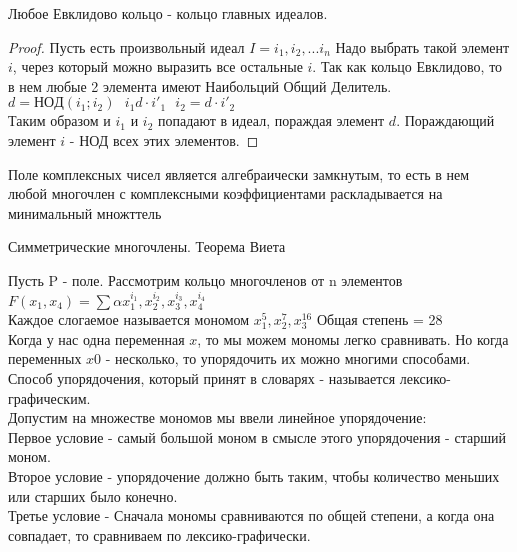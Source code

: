 \begin{theorem}
	Любое Евклидово кольцо - кольцо главных идеалов.
\end{theorem}

\begin{proof}
	Пусть есть произвольный идеал $I = {i_1, i_2, ... i_n}$ Надо выбрать такой
	элемент $i$, через который можно выразить все остальные $i$. Так как кольцо
	Евклидово, то в нем любые 2 элемента имеют Наибольций Общий Делитель.\\
	$d = НОД(i_1; i_2) ~~~ i_1 d \cdot i'_1 ~~~ i_2 = d \cdot i'_2$\\
	Таким образом и $i_1$ и $i_2$ попадают в идеал, пораждая элемент $d$.
	Пораждающий элемент $i$ - НОД всех этих элементов.
\end{proof}

\begin{theorem}
	Поле комплексных чисел является алгебраически замкнутым, то есть в нем любой
	многочлен с комплексными коэффициентами раскладывается на минимальный
	множттель
\end{theorem}

\begin{title}
	Симметрические многочлены. Теорема Виета
\end{title}

Пусть P - поле. Рассмотрим кольцо многочленов от n элементов\\
$F(x_1, x_4) = \sum \alpha x^{i_1}_1, x^{i_2}_2, x^{i_3}_3, x^{i_4}_4$\\
Каждое слогаемое называется мономом $x^{5}_1, x^{7}_2, x^{16}_3$
Общая степень = 28\\
Когда у нас одна переменная $x$, то мы можем мономы легко сравнивать. Но когда
переменных $x0$ - несколько, то упорядочить их можно многими способами.\\
Способ упорядочения, который принят в словарях - называется
лексико-графическим.\\
Допустим на множестве мономов мы ввели линейное упорядочение:\\
Первое условие - самый большой моном в смысле этого упорядочения - старший
моном.\\
Второе условие - упорядочение должно быть таким, чтобы количество меньших или
старших было конечно.\\
Третье условие - Сначала мономы сравниваются по общей степени, а когда она
совпадает, то сравниваем по лексико-графически.\\

